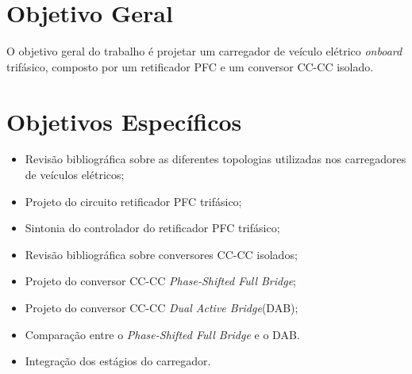 \section{Objetivo Geral}
O objetivo geral do trabalho é projetar um carregador de veículo elétrico \textit{onboard}
trifásico, composto por um retificador PFC e um conversor CC-CC isolado.
\section{Objetivos Específicos}
\begin{itemize}
    \item Revisão bibliográfica sobre as diferentes topologias utilizadas nos carregadores de veículos
          elétricos;
    \item Projeto do circuito retificador PFC trifásico;
    \item Sintonia do controlador do retificador PFC trifásico;
    \item Revisão bibliográfica sobre conversores CC-CC isolados;
    \item Projeto do conversor CC-CC \textit{Phase-Shifted Full Bridge};
    \item Projeto do conversor CC-CC \textit{Dual Active Bridge}(DAB);
    \item Comparação entre o \textit{Phase-Shifted Full Bridge} e o DAB.
    \item Integração dos estágios do carregador.
\end{itemize}
